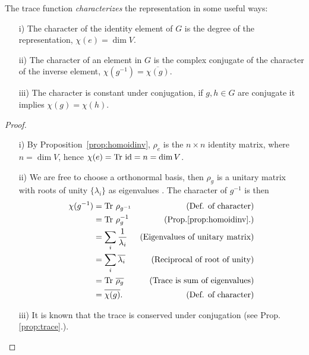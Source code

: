 \begin{proposition}\cite[Prop.2.1.]{Serre}\label{prop:charidinvconj}
	The trace function \emph{characterizes} the representation in some useful ways:
	\begin{enumerate}
		\item[i)] The character of the identity element of $G$ is the degree of the representation, $\chi(e) = \dim V$.
		\item[ii)] The character of an element in $G$ is the complex conjugate of the character of the inverse element, $\chi(g^{-1}) = \overline{\chi(g)}$.
		\item[iii)] The character is constant under conjugation, if $g,h\in G$ are conjugate it implies $\chi(g) = \chi(h)$.
	\end{enumerate}
\end{proposition}
\begin{proof}
	\begin{enumerate}
		\item[i)] By Proposition~\ref{prop:homoidinv}, $\rho_e$ is the $n \times n$ identity matrix, where $n = \dim V$, hence $\chi(e) = \text{Tr } \text{id} = n = \dim V$.
		\item[ii)] We are free to choose a orthonormal basis, then $\rho_g$ is a unitary matrix with roots of unity $\{\lambda_i\}$ as eigenvalues \cite[Exercise.8.6.15.]{Nicholson}. The character of $g^{-1}$ is then
		\begin{align*}
			\chi(g^{-1}) &= \text{Tr } \rho_{g^{-1}} & \text{(Def. of character)} \\
			&= \text{Tr } \rho_g^{-1} & \text{(Prop.\ref{prop:homoidinv}.)} \\
			&= \sum_i \frac{1}{\lambda_i} & \text{(Eigenvalues of unitary matrix)} \\
			&= \sum_i \overline{\lambda_i} & \text{(Reciprocal of root of unity)} \\
			&= \text{Tr } \overline{\rho_g} & \text{(Trace is sum of eigenvalues)} \\
			&= \overline{\chi(g)}. & \text{(Def. of character)}
		\end{align*}
		\item[iii)] It is known that the trace is conserved under conjugation (see Prop.\ref{prop:trace}.).\qedhere
	\end{enumerate}
\end{proof}

